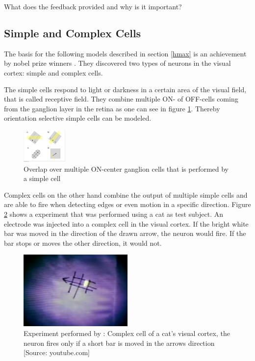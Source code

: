 			What does the feedback provided and why is it important?
			
		\subsection{Simple and Complex Cells}
			
			The basis for the following models described in section \ref{hmax} is an achievement by nobel prize winners \citeauthor{hubel1962receptive}. They discovered two types of neurons in the visual cortex: simple and complex cells.
			
			The simple cells respond to light or darkness in a certain area of the visual field, that is called receptive field. They combine multiple ON- of OFF-cells coming from the ganglion layer in the retina as one can see in figure \ref{simple-cell}. Thereby orientation selective simple cells can be modeled.
	
			\begin{figure}[H]
				\centering
				\captionsetup{justification=centering,margin=1cm}
				\includegraphics[width=0.2\textwidth, trim=6.9cm 2cm 21.4cm 17cm, clip]{images/Simple_and_Complex_Cells.pdf}
				\caption[https://en.wikipedia.org/wiki/File:Simple\_and\_Complex\_Cells.pdf]{Overlap over multiple ON-center ganglion cells that is performed by a simple cell}
				\label{simple-cell}
			\end{figure}
			
			Complex cells on the other hand combine the output of multiple simple cells and are able to fire when detecting edges or even motion in a specific direction. Figure \ref{hubel-exp} shows a experiment that was performed using a cat as test subject. An electrode was injected into a complex cell in the visual cortex. If the bright white bar was moved in the direction of the drawn arrow, the neuron would fire. If the bar stops or moves the other direction, it would not.
			
			\begin{figure}[H]
				\centering
				\captionsetup{justification=centering,margin=1cm}
				\includegraphics[width=0.5\textwidth]{images/hubel-experiment.png}
				\caption{Experiment performed by \citeauthor{hubel1962receptive}: Complex cell of a cat's visual cortex, the neuron fires only if a short bar is moved in the arrows direction [Source: youtube.com]}
				\label{hubel-exp}
			\end{figure}
			

